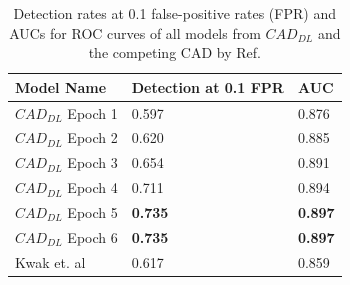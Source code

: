 \begin{table}[ht]
\centering
\caption{Detection rates at 0.1 false-positive rates (FPR) and AUCs for ROC curves of all models from $CAD_{DL}$ and the competing CAD by Ref. } 
\label{tab:table2}
\begin{center}       
\begin{tabular}{|l|l|l|} 
\hline
\rule[-1ex]{0pt}{3.5ex} Model Name &	Detection at 0.1 FPR &	AUC \\
\hline
\rule[-1ex]{0pt}{3.5ex} $CAD_{DL}$ Epoch 1 &	0.597 &	0.876 \\
\hline
\rule[-1ex]{0pt}{3.5ex} $CAD_{DL}$ Epoch 2 &	0.620 &	0.885 \\
\hline
\rule[-1ex]{0pt}{3.5ex} $CAD_{DL}$ Epoch 3 &	0.654 &	0.891 \\ 
\hline
\rule[-1ex]{0pt}{3.5ex} $CAD_{DL}$ Epoch 4 &	0.711 &	0.894 \\ 
\hline
\rule[-1ex]{0pt}{3.5ex} $CAD_{DL}$ Epoch 5 &	\textbf{0.735} &	\textbf{0.897} \\ 
\hline
\rule[-1ex]{0pt}{3.5ex} $CAD_{DL}$ Epoch 6 &	\textbf{0.735} &	\textbf{0.897} \\ 
\hline
\rule[-1ex]{0pt}{3.5ex} Kwak et. al &	0.617 &	0.859 \\ 
\hline
\end{tabular}
\end{center}
\end{table}

